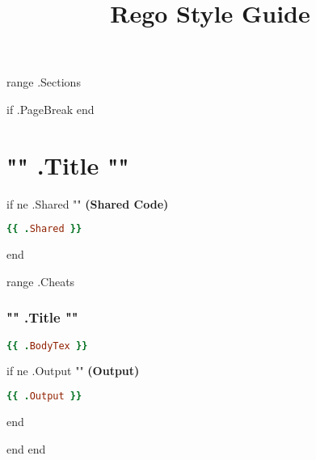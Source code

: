 \documentclass[twocolumn]{article}
\makeatletter
\renewcommand{\maketitle}{\bgroup\setlength{\parindent}{0pt}
\textbf{\LARGE{\@title}}
}
\makeatother
\begin{document}
\pagestyle{logo}
\title{Rego Style Guide}

\maketitle
\vspace{-1em}

{{ range .Sections }}

{{ if .PageBreak }}
\pagebreak
{{ end}}

\section*{{ "{" }}{{ .Title }}{{ "}" }}

{{ if ne .Shared "" }}
\textbf{\tiny{(Shared Code)}}
\begin{lstlisting}[language=Ruby]
{{ .Shared }}
\end{lstlisting}
{{ end }}

{{ range .Cheats }}
\vspace{-1em}
\subsubsection*{{ "{" }}{{ .Title }}{{ "}" }}

\begin{lstlisting}[language=Ruby]
{{ .BodyTex }}
\end{lstlisting}


{{ if ne .Output "" }}
\textbf{\tiny{(Output)}}
\begin{lstlisting}[language=Ruby]
{{ .Output }}
\end{lstlisting}
{{ end }}

{{ end }}
{{ end }}
\end{document}
